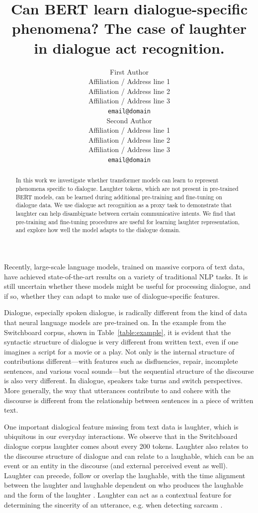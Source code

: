 \documentclass[11pt,a4paper]{article}
\title{Can BERT learn dialogue-specific phenomena? The case of laughter in dialogue act recognition. }
\author{First Author \\
  Affiliation / Address line 1 \\
  Affiliation / Address line 2 \\
  Affiliation / Address line 3 \\
  \texttt{email@domain} \\\And
  Second Author \\
  Affiliation / Address line 1 \\
  Affiliation / Address line 2 \\
  Affiliation / Address line 3 \\
  \texttt{email@domain} \\}
\date{}
\begin{document}
\maketitle
\begin{abstract}
   In this work we investigate whether transformer models can learn to represent phenomena specific to dialogue.
   Laughter tokens, which are not present in pre-trained BERT models, can be learned during additional pre-training and fine-tuning on dialogue data. 
   We use dialogue act recognition as a proxy task to demonstrate that laughter can help disambiguate between certain communicative intents.
   We find that pre-training and fine-tuning procedures are useful for learning laughter representation, and explore how well the model adapts to the dialogue domain.
\end{abstract}


Recently, large-scale language models, trained on massive corpora of text data, have achieved state-of-the-art results on a variety of traditional NLP tasks.
It is still uncertain whether these models might be useful for processing dialogue, and if so, whether they can adapt to make use of dialogue-specific features.

Dialogue, especially spoken dialogue, is radically different from the kind of data that neural language models are pre-trained on.
In the example from the Switchboard corpus, shown in Table~\ref{table:example}, it is evident that the syntactic structure of dialogue is very different from  written text, even if one imagines a script for a movie or a play.
Not only is the internal structure of contributions different---with features such as disfluencies, repair, incomplete sentences, and various vocal sounds---but the sequential structure of the discourse is also very different.
In dialogue, speakers take turns and switch perspectives.
More generally, the way that utterances contribute to and cohere with the discourse is different from the relationship between sentences in a piece of written text.

One important dialogical feature missing from text data is laughter, which is ubiquitous in our everyday interactions.
We observe that in the Switchboard dialogue corpus laughter comes about every 200 tokens.
Laughter also relates to the discourse structure of dialogue and can relate to a laughable, which can be an event or an entity in the discourse (and external perceived event as well).
Laughter can precede, follow or overlap the laughable, with the time alignment between the laughter and laughable dependent on who produces the laughable and the form of the laughter \citep{tian2016we}.
Laughter can act as a contextual feature for determining the sincerity of an utterance, e.g. when detecting sarcasm \citep{tepperman2006yeah}.
\end{document}
